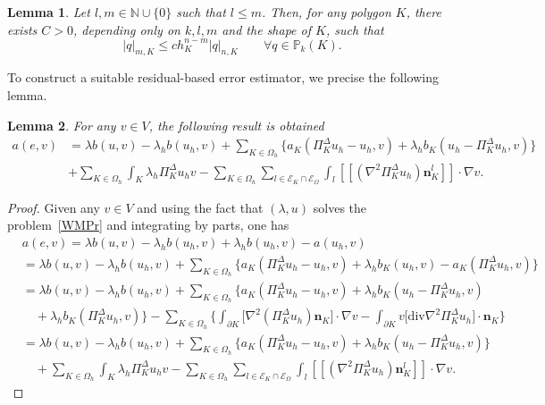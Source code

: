 \documentclass[final,reqno]{elsarticle}
\newtheorem{lemma}{Lemma}[section]
\def\N{\mathbb{N}}
\def\O{\Omega}
\def\PiK{\Pi_{K}^{\Delta}}
\def\N{\mathbb{N}}
\begin{document}
\begin{lemma}\label{lema4.2gatica2010analysis}
	Let $l,m\in \N\cup\{0\}$ such that $l\leq m$. Then, for any polygon $K$, there exists $C>0$, depending only on $k,l,m$ and the shape of $K$, such that
	\begin{equation}\label{eq4.4barrios2006residual}
	|q|_{m,K}\leq c h_K^{n-m}|q|_{n,K}\qquad \forall q\in \mathbb{P}_k(K).
	\end{equation}
\end{lemma}
To construct a suitable residual-based error estimator, we precise the following lemma.
\begin{lemma}\label{eq-residual}
	For any $v\in  V $, the following result is obtained
	 \begin{align*}
	 a(e,v)	 &= \lambda b(u,v)-\lambda_h b( u_h,v) + \sum\limits_{K\in \Omega_h} \Big\{ a_K(\PiK u_h-u_h,v)+ \lambda_h  b_{K}( u_h-\PiK u_h,v) \Big\}\\
     &+ \sum\limits_{K\in \Omega_h}   \int_{K}\lambda_h\PiK u_hv  - \sum\limits_{K\in \Omega_h}\sum_{l\in \mathcal{E}_K\cap \mathcal{E}_{\O}}\int_l [\![(\nabla^2\PiK u_h )\boldsymbol{n}_K^l]\!]\cdot \nabla v.
	 \end{align*}
\end{lemma}
\begin{proof}
Given any $v\in  V $ and using the fact that $(\lambda,u)$ solves the problem~\eqref{WMPr} and integrating by parts, one has
\begin{align*}
&a(e,v)%
=\lambda b(u,v)-\lambda_h b(u_h,v) + \lambda_h b(u_h,v)-a(u_h,v)\nonumber\\
&= \lambda b(u,v)-\lambda_h b(u_h,v)  + \sum\limits_{K\in \Omega_h} \Big\{a_{K} (\PiK u_h-u_h,v) + \lambda_h  b_{K}(u_h,v) -  a_{K}(\PiK u_h,v)\Big\}\nonumber\\
&= \lambda b(u,v)-\lambda_h b(u_h,v)  + \sum\limits_{K\in \Omega_h} \Big\{a_{K} (\PiK u_h-u_h,v) + \lambda_h  b_{K}(u_h-\PiK u_h,v)\nonumber\\
&\quad + \lambda_h  b_{K}(\PiK u_h,v)\Big\} - \sum\limits_{K\in \Omega_h} \Bigg\{ \int_{\partial K} \Big[\nabla^2(\PiK u_h)\boldsymbol{n}_{K}\Big]\cdot \nabla v - \int_{\partial K}v \Big[ \mathrm{div} \nabla^2 \PiK u_h\Big]\cdot \boldsymbol{n}_K \Bigg\} \nonumber\\
&= \lambda b(u,v)-\lambda_h b( u_h,v) + \sum\limits_{K\in \Omega_h} \Big\{ a_K(\PiK u_h-u_h,v)+ \lambda_h  b_{K}( u_h-\PiK u_h,v) \Big\}\\
&\quad + \sum\limits_{K\in \Omega_h}   \int_{K}\lambda_h\PiK u_hv  - \sum\limits_{K\in \Omega_h}\sum_{l\in \mathcal{E}_K\cap \mathcal{E}_{\O}}\int_l [\![(\nabla^2\PiK u_h )\boldsymbol{n}_K^l]\!]\cdot \nabla v.\nonumber
\end{align*}
\end{proof}
\end{document}
